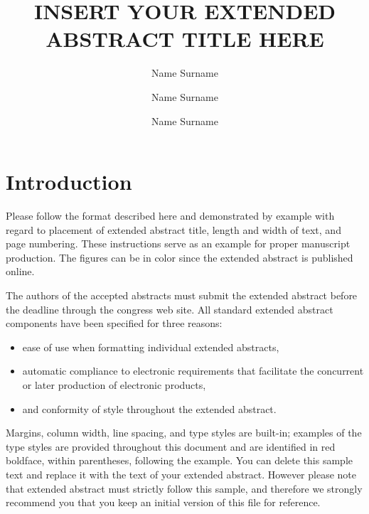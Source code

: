 \documentclass[IAHRdraft]{IAHRYPN}
\title{INSERT YOUR EXTENDED ABSTRACT TITLE HERE}
\author[1]{Name Surname}
\author[2]{Name Surname}
\author[*1,2]{Name Surname}
\affil[1]{Institution 1, City, Country}
\affil[2]{Institution 2, City, Country}
\begin{document}
\maketitle




\section{Introduction}
Please follow the format described here and demonstrated by example with regard to placement of extended abstract title, length and width of text, and page numbering. These instructions serve as an example for proper manuscript production. The figures can be in color since the extended abstract is published online.

The authors of the accepted abstracts must submit the extended abstract before the deadline through the congress web site. All standard extended abstract components have been specified for three reasons:
\begin{itemize}
    \item ease of use when formatting individual extended abstracts,
    \item  automatic compliance to electronic requirements that facilitate the concurrent or later production of electronic products,
    \item and conformity of style throughout the extended abstract.
\end{itemize}

Margins, column width, line spacing, and type styles are built-in; examples of the type styles are provided throughout this document and are identified in red boldface, within parentheses, following the example. 
You can delete this sample text and replace it with the text of your extended abstract. However please note that extended abstract must strictly follow this sample, and therefore we strongly recommend you that you keep an initial version of this file for reference.
\end{document}

